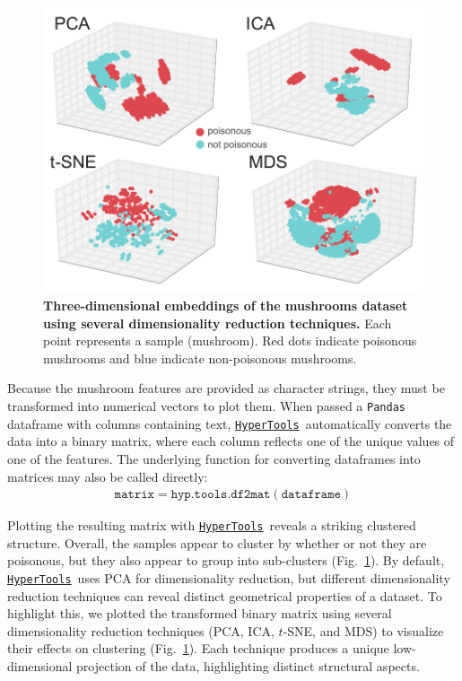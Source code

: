 \documentclass[12pt,letterpaper]{article}
\newcommand{\hypertools}{\href{https://github.com/ContextLab/hypertools}{\texttt{HyperTools}}}
\begin{document}
\begin{figure}[tbp]
\centering
\includegraphics[width=.75\textwidth]{mushrooms1}
\caption{\textbf{Three-dimensional embeddings of the mushrooms dataset using several dimensionality reduction techniques.} Each point represents a sample (mushroom).  Red dots indicate poisonous mushrooms and blue indicate non-poisonous mushrooms.} \label{fig:mushproj}
\end{figure}

Because the mushroom features are provided as character strings, they must be transformed into numerical vectors to plot them.  When passed a \texttt{Pandas} dataframe with columns containing text, \hypertools~automatically converts the data into a binary matrix, where each column reflects one of the unique values of one of the features.  The underlying function for converting dataframes into matrices may also be called directly:
\begin{align}
\mathtt{matrix = hyp.tools.df2mat(dataframe)}
\end{align}

Plotting the resulting matrix with \hypertools~reveals a striking clustered structure.  Overall, the samples appear to cluster by whether or not they are poisonous, but they also appear to group into sub-clusters (Fig.~\ref{fig:mushproj}). By default, \hypertools~uses PCA for dimensionality reduction, but different dimensionality reduction techniques can reveal distinct geometrical properties of a dataset. To highlight this, we plotted the transformed binary matrix using several dimensionality reduction techniques (PCA, ICA, $t$-SNE, and MDS) to visualize their effects on clustering (Fig.~\ref{fig:mushproj}). Each technique produces a unique low-dimensional projection of the data, highlighting distinct structural aspects.
\end{document}
